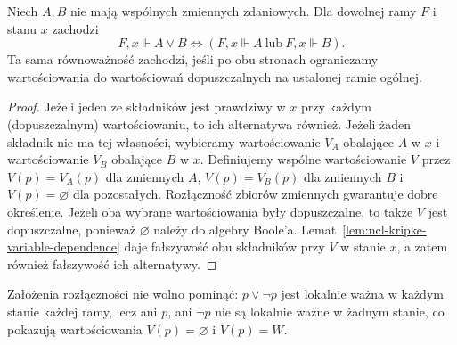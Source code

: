 \begin{lemat}
\label{lem:ncl-kripke-disjoint-disjunction}
Niech $A,B$ nie mają wspólnych zmiennych
zdaniowych. Dla dowolnej ramy $F$ i stanu $x$
zachodzi
\[
 F,x\Vdash A\vee B
 \iff (F,x\Vdash A\ \text{lub}\ F,x\Vdash B).
\]
Ta sama równoważność zachodzi, jeśli po obu
stronach ograniczamy wartościowania do
wartościowań dopuszczalnych na ustalonej
ramie ogólnej.
\end{lemat}
\begin{proof}
Jeżeli jeden ze składników jest prawdziwy
w $x$ przy każdym (dopuszczalnym)
wartościowaniu, to ich alternatywa również.
Jeżeli żaden składnik nie ma tej własności,
wybieramy wartościowanie $V_A$ obalające
$A$ w $x$ i wartościowanie $V_B$ obalające
$B$ w $x$. Definiujemy wspólne wartościowanie
$V$ przez $V(p)=V_A(p)$ dla zmiennych $A$,
$V(p)=V_B(p)$ dla zmiennych $B$ i
$V(p)=\varnothing$ dla pozostałych.
Rozłączność zbiorów zmiennych gwarantuje
dobre określenie. Jeżeli oba wybrane
wartościowania były dopuszczalne, to
także $V$ jest dopuszczalne, ponieważ
$\varnothing$ należy do algebry Boole'a.
Lemat~\ref{lem:ncl-kripke-variable-dependence}
daje fałszywość obu składników przy $V$
w stanie $x$, a zatem również fałszywość
ich alternatywy.
\end{proof}
Założenia rozłączności nie wolno pominąć:
$p\vee\neg p$ jest lokalnie ważna w każdym
stanie każdej ramy, lecz ani $p$, ani
$\neg p$ nie są lokalnie ważne w żadnym stanie,
co pokazują wartościowania $V(p)=\varnothing$
i $V(p)=W$.

